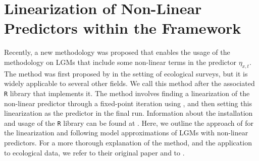 \newpage
\section{Linearization of Non-Linear Predictors within the \inla Framework}
\label{sec:inlabru}

Recently, a new methodology was proposed that enables the usage of the \inla methodology on LGMs that include some non-linear terms in the predictor $\eta_{x,t}$. The method was first proposed by \textcite{BachlLindgren2019} in the setting of ecological surveys, but it is widely applicable to several other fields. We call this method \inlabru after the associated \texttt{R} library that implements it. The \inlabru method involves finding a linearization of the non-linear predictor through a fixed-point iteration using \inla, and then setting this linearization as the predictor in the final \inla run. Information about the installation and usage of the \inlabru \texttt{R} library can be found at \textcite{Inlabru}. Here, we outline the approach of \textcite{BachlLindgren2019} for the linearization and following model approximations of LGMs with non-linear predictors. For a more thorough explanation of the method, and the application to ecological data, we refer to their original paper \parencite{BachlLindgren2019} and to \textcite{Inlabru}.

